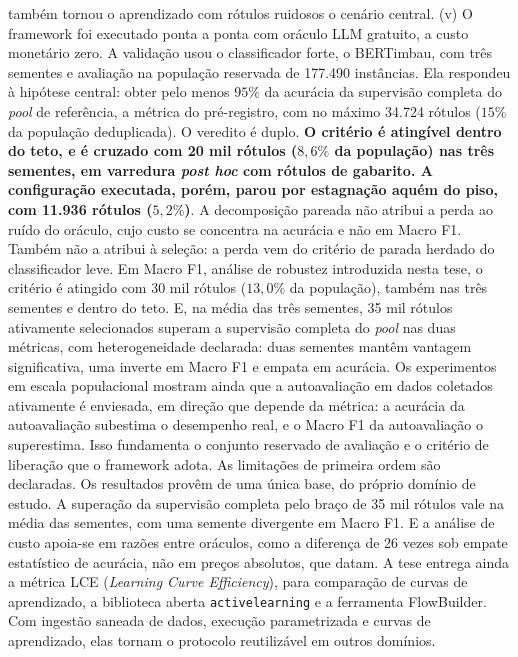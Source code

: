 \begin{resumo}
também tornou o aprendizado com rótulos ruidosos o cenário central. (v) O framework foi executado ponta a ponta com oráculo LLM gratuito, a custo monetário zero. A validação usou o classificador forte, o BERTimbau, com três sementes e avaliação na população reservada de 177.490 instâncias. Ela respondeu à hipótese central: obter pelo menos $95\%$ da acurácia da supervisão completa do \textit{pool} de referência, a métrica do pré-registro, com no máximo 34.724 rótulos ($15\%$ da população deduplicada). O veredito é duplo. \textbf{O critério é atingível dentro do teto, e é cruzado com 20 mil rótulos ($8{,}6\%$ da população) nas três sementes, em varredura \textit{post hoc} com rótulos de gabarito. A configuração executada, porém, parou por estagnação aquém do piso, com 11.936 rótulos ($5{,}2\%$)}. A decomposição pareada não atribui a perda ao ruído do oráculo, cujo custo se concentra na acurácia e não em Macro F1. Também não a atribui à seleção: a perda vem do critério de parada herdado do classificador leve. Em Macro F1, análise de robustez introduzida nesta tese, o critério é atingido com 30 mil rótulos ($13{,}0\%$ da população), também nas três sementes e dentro do teto. E, na média das três sementes, 35 mil rótulos ativamente selecionados superam a supervisão completa do \textit{pool} nas duas métricas, com heterogeneidade declarada: duas sementes mantêm vantagem significativa, uma inverte em Macro F1 e empata em acurácia. Os experimentos em escala populacional mostram ainda que a autoavaliação em dados coletados ativamente é enviesada, em direção que depende da métrica: a acurácia da autoavaliação subestima o desempenho real, e o Macro F1 da autoavaliação o superestima. Isso fundamenta o conjunto reservado de avaliação e o critério de liberação que o framework adota. As limitações de primeira ordem são declaradas. Os resultados provêm de uma única base, do próprio domínio de estudo. A superação da supervisão completa pelo braço de 35 mil rótulos vale na média das sementes, com uma semente divergente em Macro F1. E a análise de custo apoia-se em razões entre oráculos, como a diferença de 26 vezes sob empate estatístico de acurácia, não em preços absolutos, que datam. A tese entrega ainda a métrica LCE (\textit{Learning Curve Efficiency}), para comparação de curvas de aprendizado, a biblioteca aberta \texttt{activelearning} e a ferramenta FlowBuilder. Com ingestão saneada de dados, execução parametrizada e curvas de aprendizado, elas tornam o protocolo reutilizável em outros domínios.

\end{resumo}
